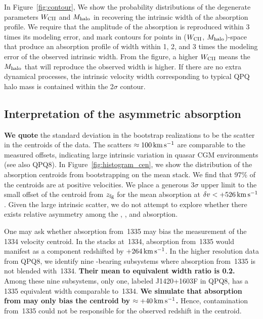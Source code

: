 \documentclass[iop]{emulateapj}
\begin{document}
In Figure~\ref{fig:contour}, We show the probability distributions of the degenerate parameters
$W_{\rm CII}$ and $M_{\rm halo}$ in recovering the intrinsic width of the absorption profile. We
require that the amplitude of the absorption is reproduced within 3 times its modeling error, and
mark contours for points in ($W_{\rm CII}$, $M_{\rm halo}$)-space that produce an absorption
profile of width within 1, 2, and 3 times the modeling error of the observed intrinsic width.
From the figure, a higher $W_{\rm CII}$ means the $M_{\rm halo}$ that will reproduce the observed
width is higher. If there are no extra dynamical processes, the intrinsic velocity width
corresponding to typical QPQ halo mass is contained within the 2$\sigma$ contour.

\subsection{Interpretation of the asymmetric absorption}
\label{sec:significance_+ve}

{\bf We quote} the standard deviation in the bootstrap
realizations to be the scatter in the centroids of the data. The scatters
$\approx100\,{\rm km\,s^{-1}}$ are comparable to the measured offsets, indicating large intrinsic
variation in quasar CGM environments (see also QPQ8). In Figure~\ref{fig:histogram_cen}, we show
the distribution of the absorption centroids from bootstrapping on the  mean stack. We
find that 97\% of the centroids are at positive velocities. We place a generous $3\sigma$ upper
limit to the small offset of the centroid from $z_{\rm fg}$ for the  mean absorption at
$\delta v<+526\,{\rm km\,s^{-1}}$. Given the large intrinsic scatter, we do not attempt to explore
whether there exists relative asymmetry among the , , and 
absorption.

One may ask whether absorption from \,1335 may bias the measurement of the
\,1334 velocity centroid. In the stacks at \,1334, absorption from \,1335
would manifest as a component redshifted by $+264\,{\rm km\,s^{-1}}$.
In the higher resolution data from QPQ8, we identify nine -bearing subsystems where absorption
from \,1335 is not blended with \,1334.
{\bf Their mean  to  equivalent width ratio is 0.2.}
Among these nine subsystems, only one,
labeled J1420+1603F in QPQ8, has a \,1335 equivalent width comparable to \,1334.
{\bf We simulate that absorption from  may only bias the  centroid by
$\approx+40\,{\rm km\,s^{-1}}$.}
Hence, contamination from \,1335 could not be responsible for the observed redshift in
the centroid.
\end{document}
